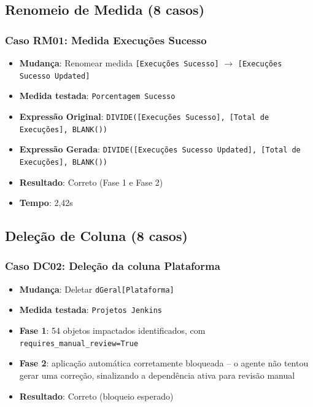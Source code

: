 \subsection{Renomeio de Medida (8 casos)}

\subsubsection{Caso RM01: Medida Execuções Sucesso}

\begin{itemize}
    \item \textbf{Mudança}: Renomear medida \texttt{[Execuções Sucesso]} $\rightarrow$ \texttt{[Execuções Sucesso Updated]}
    \item \textbf{Medida testada}: \texttt{Porcentagem Sucesso}
    \item \textbf{Expressão Original}: \texttt{DIVIDE([Execuções Sucesso], [Total de Execuções], BLANK())}
    \item \textbf{Expressão Gerada}: \texttt{DIVIDE([Execuções Sucesso Updated], [Total de Execuções], BLANK())}
    \item \textbf{Resultado}: Correto (Fase 1 e Fase 2)
    \item \textbf{Tempo}: 2,42s
\end{itemize}

\subsection{Deleção de Coluna (8 casos)}

\subsubsection{Caso DC02: Deleção da coluna Plataforma}

\begin{itemize}
    \item \textbf{Mudança}: Deletar \texttt{dGeral[Plataforma]}
    \item \textbf{Medida testada}: \texttt{Projetos Jenkins}
    \item \textbf{Fase 1}: 54 objetos impactados identificados, com \texttt{requires\_manual\_review=True}
    \item \textbf{Fase 2}: aplicação automática corretamente bloqueada -- o agente não tentou gerar uma correção, sinalizando a dependência ativa para revisão manual
    \item \textbf{Resultado}: Correto (bloqueio esperado)
\end{itemize}

